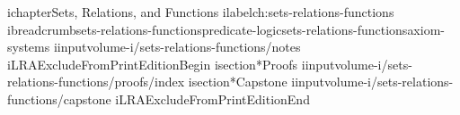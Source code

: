 ichapter{Sets, Relations, and Functions}
ilabel{ch:sets-relations-functions}
ibreadcrumb{sets-relations-functions}{predicate-logic}{sets-relations-functions}{axiom-systems}
iinput{volume-i/sets-relations-functions/notes}
iLRAExcludeFromPrintEditionBegin
isection*{Proofs}
iinput{volume-i/sets-relations-functions/proofs/index}
isection*{Capstone}
iinput{volume-i/sets-relations-functions/capstone}
iLRAExcludeFromPrintEditionEnd
